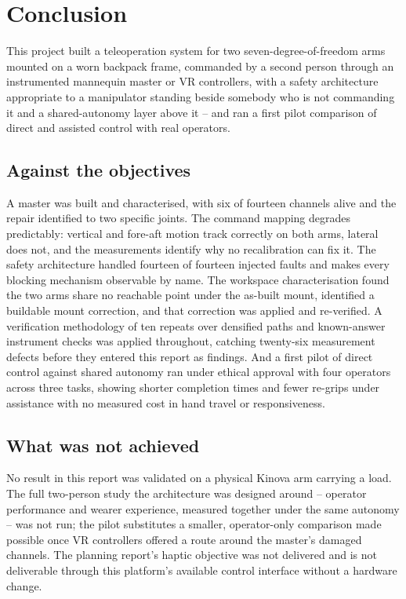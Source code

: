 \chapter{Conclusion}
\label{ch:conclusion}

This project built a teleoperation system for two seven-degree-of-freedom
arms mounted on a worn backpack frame, commanded by a second person through
an instrumented mannequin master or VR controllers, with a safety
architecture appropriate to a manipulator standing beside somebody who is not
commanding it and a shared-autonomy layer above it -- and ran a first pilot
comparison of direct and assisted control with real operators.

\section{Against the objectives}

A master was built and characterised, with six of fourteen channels alive
and the repair identified to two specific joints. The command mapping
degrades predictably: vertical and fore-aft motion track correctly on both
arms, lateral does not, and the measurements identify why no recalibration
can fix it. The safety architecture handled fourteen of fourteen injected
faults and makes every blocking mechanism observable by name. The workspace
characterisation found the two arms share no reachable point under the
as-built mount, identified a buildable mount correction, and that correction
was applied and re-verified. A verification methodology of ten repeats over
densified paths and known-answer instrument checks was applied throughout,
catching twenty-six measurement defects before they entered this report as
findings. And a first pilot of direct control against shared autonomy ran
under ethical approval with four operators across three tasks, showing
shorter completion times and fewer re-grips under assistance with no
measured cost in hand travel or responsiveness.

\section{What was not achieved}

No result in this report was validated on a physical Kinova arm carrying a
load. The full two-person study the architecture was designed around --
operator performance and wearer experience, measured together under the same
autonomy -- was not run; the pilot substitutes a smaller, operator-only
comparison made possible once VR controllers offered a route around the
master's damaged channels. The planning report's haptic objective was not
delivered and is not deliverable through this platform's available control
interface without a hardware change.

